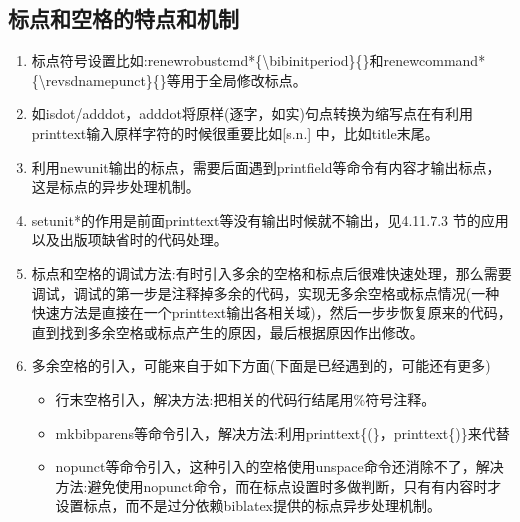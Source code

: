 \begin{enumerate}
\begin{texlist}
\end{texlist}

\end{enumerate}

\subsection{标点和空格的特点和机制}
  \begin{enumerate}
    \item 标点符号设置比如:renewrobustcmd*\{\textbackslash bibinitperiod\}\{\}和renewcommand*\{\textbackslash revsdnamepunct\}\{\}等用于全局修改标点。
    \item 如isdot/adddot，adddot将原样(逐字，如实)句点转换为缩写点在有利用printtext输入原样字符的时候很重要比如[s.n.] 中，比如title末尾。
    \item 利用newunit输出的标点，需要后面遇到printfield等命令有内容才输出标点，这是标点的异步处理机制。
    \item setunit*的作用是前面printtext等没有输出时候就不输出，见4.11.7.3 节的应用以及出版项缺省时的代码处理。
    \item 标点和空格的调试方法:有时引入多余的空格和标点后很难快速处理，那么需要调试，调试的第一步是注释掉多余的代码，实现无多余空格或标点情况(一种快速方法是直接在一个printtext输出各相关域)，然后一步步恢复原来的代码，直到找到多余空格或标点产生的原因，最后根据原因作出修改。
    \item 多余空格的引入，可能来自于如下方面(下面是已经遇到的，可能还有更多)
    \begin{itemize}
    \item 行末空格引入，解决方法:把相关的代码行结尾用\%符号注释。
    \item mkbibparens等命令引入，解决方法:利用printtext\{(\}，printtext\{)\}来代替
    \item nopunct等命令引入，这种引入的空格使用unspace命令还消除不了，解决方法:避免使用nopunct命令，而在标点设置时多做判断，只有有内容时才设置标点，而不是过分依赖biblatex提供的标点异步处理机制。
    \end{itemize}
  \end{enumerate}


